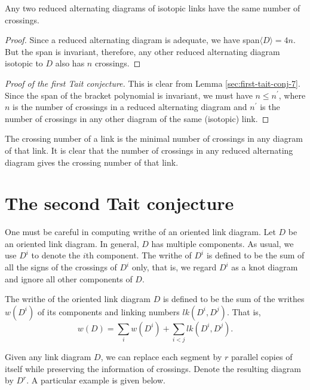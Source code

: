 \begin{lemma}
\label{sec:first-tait-conj-11}
Any two reduced alternating diagrams of isotopic links have the same number of crossings.
\end{lemma}

\begin{proof}
\label{sec:first-tait-conj-12}
Since a reduced alternating diagram is adequate, we have span$\langle D \rangle = 4n$. But the span is invariant, therefore, any other reduced alternating diagram isotopic to $D$ also has $n$ crossings.
\end{proof}

\begin{proof}[Proof of the first Tait conjecture]
  \label{sec:first-tait-conj-13}
  This is clear from Lemma \ref{sec:first-tait-conj-7}. Since the span of the bracket polynomial is invariant, we must have $n \leq n^{\prime}$, where $n$ is the number of crossings in a reduced alternating diagram and $n^{\prime}$ is the number of crossings in any other diagram of the same (isotopic) link.
\end{proof}

The crossing number of a link is the minimal number of crossings in any diagram of that link. It is clear that the number of crossings in any reduced alternating diagram gives the crossing number of that link.

\section{The second Tait conjecture}

One must be careful in computing writhe of an oriented link diagram. Let $D$ be an oriented link diagram. In general, $D$ has multiple components. As usual, we use $D^i$ to denote the $i$th component. The writhe of $D^i$ is defined to be the sum of all the signs of the crossings of $D^i$ only, that is, we regard $D^i$ as a knot diagram and ignore all other components of $D$.

The writhe of the oriented link diagram $D$ is defined to be the sum of the writhes $w(D^i)$ of its components and linking numbers $lk(D^i, D^j)$. That is, 
\begin{displaymath}
w(D) = \sum_i^{}w(D^i) + \sum_{i < j}^{} lk(D^i, D^j).
\end{displaymath}

Given any link diagram $D$, we can replace each segment by $r$ parallel copies of itself while preserving the information of crossings. Denote the resulting diagram by $D^r$. A particular example is given below.

